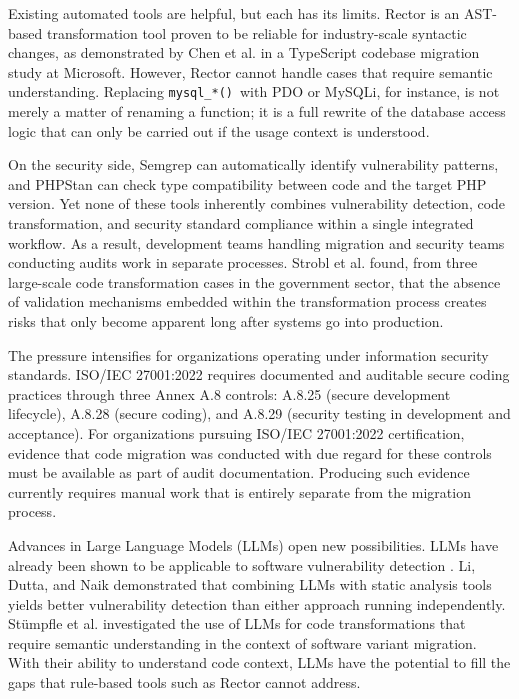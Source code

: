 Existing automated tools are helpful, but each has its limits. Rector \cite{rector2024} is an AST-based transformation tool proven to be reliable for industry-scale syntactic changes, as demonstrated by Chen et al. \cite{chen2022ast} in a TypeScript codebase migration study at Microsoft. However, Rector cannot handle cases that require semantic understanding. Replacing \texttt{mysql\_*()}\ with PDO or MySQLi, for instance, is not merely a matter of renaming a function; it is a full rewrite of the database access logic that can only be carried out if the usage context is understood.

On the security side, Semgrep \cite{semgrep2024} can automatically identify vulnerability patterns, and PHPStan \cite{phpstan2024} can check type compatibility between code and the target PHP version. Yet none of these tools inherently combines vulnerability detection, code transformation, and security standard compliance within a single integrated workflow. As a result, development teams handling migration and security teams conducting audits work in separate processes. Strobl et al. \cite{strobl2020automated} found, from three large-scale code transformation cases in the government sector, that the absence of validation mechanisms embedded within the transformation process creates risks that only become apparent long after systems go into production.

The pressure intensifies for organizations operating under information security standards. ISO/IEC 27001:2022 \cite{iso27001_2022} requires documented and auditable secure coding practices through three Annex A.8 controls: A.8.25 (secure development lifecycle), A.8.28 (secure coding), and A.8.29 (security testing in development and acceptance). For organizations pursuing ISO/IEC 27001:2022 certification, evidence that code migration was conducted with due regard for these controls must be available as part of audit documentation. Producing such evidence currently requires manual work that is entirely separate from the migration process.

Advances in Large Language Models (LLMs) open new possibilities. LLMs have already been shown to be applicable to software vulnerability detection \cite{akuthota2023vulnerability}\cite{li2025software}. Li, Dutta, and Naik \cite{li2025iris} demonstrated that combining LLMs with static analysis tools yields better vulnerability detection than either approach running independently. Stümpfle et al. \cite{stumpfle2025llm} investigated the use of LLMs for code transformations that require semantic understanding in the context of software variant migration. With their ability to understand code context, LLMs have the potential to fill the gaps that rule-based tools such as Rector cannot address.

